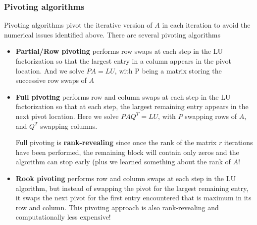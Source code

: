 \documentclass{article}
\begin{document}
\subsubsection{Pivoting algorithms}
Pivoting algorithms pivot the iterative version of $A$ in each iteration to avoid the numerical issues identified above. There are several pivoting algorithms
\begin{itemize}
    \item \textbf{Partial/Row pivoting} performs row swaps at each step in the LU factorization so that the largest entry in a column appears in the pivot location. And we solve $PA = LU$, with P being a matrix storing the successive row swaps of $A$
    \item \textbf{Full pivoting} performs row and column swaps at each step in the LU factorization so that at each step, the largest remaining entry appears in the next pivot location. Here we solve $PAQ^T = LU$, with $P$ swapping rows of $A$, and $Q^T$ swapping columns.
    
    Full pivoting is \textbf{rank-revealing} since once the rank of the matrix $r$ iterations have been performed, the remaining block will contain only zeros and the algorithm can stop early (plus we learned something about the rank of $A$!
    \item \textbf{Rook pivoting} performs row and column swaps at each step in the LU algorithm, but instead of swapping the pivot for the largest remaining entry, it swaps the next pivot for the first entry encountered that is maximum in its row and column. This pivoting approach is also rank-revealing and computationally less expensive!
\end{itemize}


\end{document}
